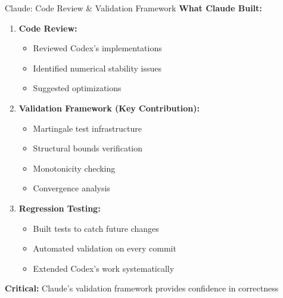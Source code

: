 \documentclass[aspectratio=169,11pt]{beamer}
\begin{document}
\begin{frame}{Claude: Code Review \& Validation Framework}
\textbf{What Claude Built:}

\begin{enumerate}
    \item \textbf{Code Review:}
    \begin{itemize}
        \item Reviewed Codex's implementations
        \item Identified numerical stability issues
        \item Suggested optimizations
    \end{itemize}

    \item \textbf{Validation Framework (Key Contribution):}
    \begin{itemize}
        \item Martingale test infrastructure
        \item Structural bounds verification
        \item Monotonicity checking
        \item Convergence analysis
    \end{itemize}

    \item \textbf{Regression Testing:}
    \begin{itemize}
        \item Built tests to catch future changes
        \item Automated validation on every commit
        \item Extended Codex's work systematically
    \end{itemize}
\end{enumerate}

\textbf{Critical:} Claude's validation framework provides confidence in correctness
\end{frame}
\end{document}
